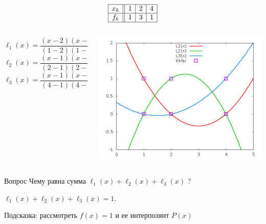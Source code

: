 \documentclass[professionalfonts,compress,unicode]{beamer}
\begin{document}
{
	$$
	\begin{array}{|c||c|c|c|}
	\hline
	x_k&1&2&4\\
	\hline
	f_k&1&3&1\\
	\hline
	\end{array}
	$$
	\begin{columns}[T]
		\begin{column}{0.55\textwidth}
		\vspace{-0.5cm}
		$$
		\ell_1(x) = \frac{(x-2)(x-4)}{(1-2)(1-4)} = \frac{1}{3}(x-2)(x-4)
		$$
		$$
		\ell_2(x) = \frac{(x-1)(x-4)}{(2-1)(2-4)} = \frac{1}{2}(x-1)(4-x)
		$$
		$$
		\ell_3(x) = \frac{(x-1)(x-2)}{(4-1)(4-2)} = \frac{1}{6}(x-1)(x-2)
		$$
		\end{column}
		\begin{column}{0.45\textwidth}
		\includegraphics[width=\textwidth]{l.png}
		\end{column}
	\end{columns}
	\pause
	
	\begin{block}{Вопрос}
		Чему равна сумма $\ell_1(x) + \ell_2(x) + \ell_3(x)$ ?
		\pause
		
		$\ell_1(x) + \ell_2(x) + \ell_3(x) = 1$. 
		
		Подсказка: рассмотреть $f(x) = 1$ и ее интерполянт $P(x)$
		
	\end{block}
}
\end{document}
